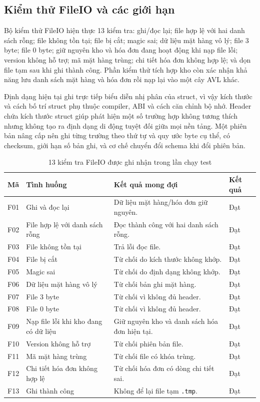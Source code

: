 \subsection{Kiểm thử FileIO và các giới hạn}
Bộ kiểm thử FileIO hiện thực 13 kiểm tra: ghi/đọc lại; file hợp lệ với hai danh sách rỗng; file không tồn tại; file bị cắt; magic sai; dữ liệu mặt hàng vô lý; file 3 byte; file 0 byte; giữ nguyên kho và hóa đơn đang hoạt động khi nạp file lỗi; version không hỗ trợ; mã mặt hàng trùng; chi tiết hóa đơn không hợp lệ; và dọn file tạm sau khi ghi thành công. Phần kiểm thử tích hợp kho còn xác nhận khả năng lưu danh sách mặt hàng và hóa đơn rồi nạp lại vào một cây AVL khác.

Định dạng hiện tại ghi trực tiếp biểu diễn nhị phân của struct, vì vậy kích thước và cách bố trí struct phụ thuộc compiler, ABI và cách căn chỉnh bộ nhớ. Header chứa kích thước struct giúp phát hiện một số trường hợp không tương thích nhưng không tạo ra định dạng di động tuyệt đối giữa mọi nền tảng. Một phiên bản nâng cấp nên ghi từng trường theo thứ tự và quy ước byte cụ thể, có checksum, giới hạn số bản ghi, và cơ chế chuyển đổi schema khi đổi phiên bản.

\begin{table}[H]
\centering
\caption{13 kiểm tra FileIO được ghi nhận trong lần chạy test}
\label{tab:test_fileio}
\scriptsize
\begin{tabular}{@{}p{0.8cm}p{4.3cm}p{6.7cm}p{1.2cm}@{}}
\toprule
\textbf{Mã} & \textbf{Tình huống} & \textbf{Kết quả mong đợi} & \textbf{Kết quả} \\
\midrule
F01 & Ghi và đọc lại & Dữ liệu mặt hàng/hóa đơn giữ nguyên. & Đạt \\
F02 & File hợp lệ với danh sách rỗng & Đọc thành công với hai danh sách rỗng. & Đạt \\
F03 & File không tồn tại & Trả lỗi đọc file. & Đạt \\
F04 & File bị cắt & Từ chối do kích thước không khớp. & Đạt \\
F05 & Magic sai & Từ chối do định dạng không khớp. & Đạt \\
F06 & Dữ liệu mặt hàng vô lý & Từ chối bản ghi mặt hàng. & Đạt \\
F07 & File 3 byte & Từ chối vì không đủ header. & Đạt \\
F08 & File 0 byte & Từ chối vì không đủ header. & Đạt \\
F09 & Nạp file lỗi khi kho đang có dữ liệu & Giữ nguyên kho và danh sách hóa đơn hiện tại. & Đạt \\
F10 & Version không hỗ trợ & Từ chối phiên bản file. & Đạt \\
F11 & Mã mặt hàng trùng & Từ chối file có khóa trùng. & Đạt \\
F12 & Chi tiết hóa đơn không hợp lệ & Từ chối hóa đơn có dòng chi tiết sai. & Đạt \\
F13 & Ghi thành công & Không để lại file tạm \texttt{.tmp}. & Đạt \\
\bottomrule
\end{tabular}
\end{table}

